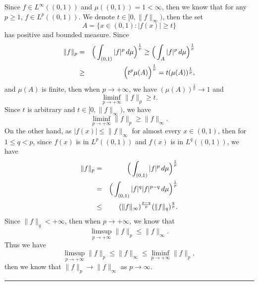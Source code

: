 \documentclass[12pt]{article}
\begin{document}
Since $f \in L^{\infty} ((0,1))$ and $\mu((0, 1)) = 1 < \infty$, then we know that for any $p \geq 1$, $f \in L^{p}((0, 1))$. We denote $t \in [0, \|f \|_{\infty})$, then the set 
\begin{equation*}
   A = \{x \in (0, 1): |f(x)| \geq t \}
\end{equation*}
has positive and bounded measure. Since
\begin{eqnarray*}
\|f\|_{p} & = & \Big{(} \int_{(0, 1)}^{} |f|^{p} \, d \mu \Big{)}^{\frac{1}{p}} \geq \Big{(} \int_{A}^{} |f|^{p} \, d \mu \Big{)}^{\frac{1}{p}} \\
& \geq & \Big{(} t^{p} \mu(A)\Big{)}^{\frac{1}{p}} = t (\mu(A))^{\frac{1}{p}},
\end{eqnarray*}
and $\mu(A)$ is finite, then when $p \to + \infty$, we have $(\mu(A))^{\frac{1}{p}} \to 1$ and
\begin{equation*}
   \liminf_{p \to + \infty} \|f\|_{p} \geq t.
\end{equation*}
Since $t$ is arbitrary and $t \in [0, \|f \|_{\infty})$, we have
\begin{equation*}
   \liminf_{p \to + \infty} \|f\|_{p} \geq \|f \|_{\infty} .
\end{equation*}
On the other hand, as $|f(x)| \leq \|f\|_{\infty}$ for almost every $x \in (0, 1)$, then for $1 \leq q < p$, since $f(x)$ is in $L^{p}((0, 1))$ and $f(x)$ is in $L^{q}((0, 1))$, we have
\begin{eqnarray*}
\|f\|_{p} & = & \Big{(} \int_{(0, 1)}^{} |f|^{p} \, d \mu \Big{)}^{\frac{1}{p}} \\
& = & \Big{(} \int_{(0, 1)}^{} |f|^{q} |f|^{p - q} \, d \mu \Big{)}^{\frac{1}{p}} \\
& \leq & (\|f\|_{\infty})^{\frac{p - q}{p}} (\|f\|_{q})^{\frac{q}{p}}.
\end{eqnarray*}
Since $\|f\|_{q} < + \infty$, then when $p \to + \infty$, we know that
\begin{equation*}
   \limsup_{p \to + \infty} \|f\|_{p} \leq \|f \|_{\infty} .
\end{equation*}
Thus we have
\begin{equation*}
   \limsup_{p \to + \infty} \|f\|_{p} \leq \|f \|_{\infty} \leq \liminf_{p \to + \infty} \|f\|_{p},
\end{equation*}
then we know that $\|f \|_{p} \rightarrow \|f \|_{\infty}$ as $p \rightarrow \infty$.


\noindent\rule[0.25\baselineskip]{\textwidth}{0.5pt}

\vspace{8pt}
\end{document}
